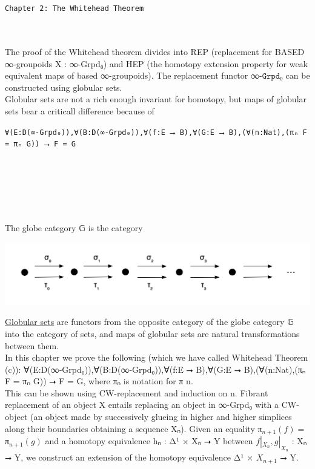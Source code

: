 \documentclass{book}
\theoremstyle{definition}
\newcounter{pcounter}
\newcounter{sectioncount}
\newcounter{subsectioncount}
\renewcommand{\section}[1]{\newpage\ \\ \ \\ \begin{center} \scalebox{1.5}{\texttt{\thesectioncount . #1}} \stepcounter{sectioncount} \setcounter{subsectioncount}{1} \end{center} \begin{center} \ \\ \ \\ \thispagestyle{empty} \end{center}}
\renewcommand{\chapter}[1]{
\newpage
{
\Huge 
\begin{center}
\ \\
\ \\
\thispagestyle{empty}
\texttt{#1}
\end{center}}
\ \\
\ \\
}
\begin{document}
\chapter{Chapter 2: The Whitehead Theorem}

The proof of the Whitehead theorem divides into REP (replacement for BASED ∞-groupoids X : ∞-Grpd₀) and HEP (the homotopy extension property for weak equivalent maps of based ∞-groupoids). The replacement functor ∞$\texttt{-Grpd}$₀ can be constructed using globular sets.\\

Globular sets are not a rich enough invariant for homotopy, but maps of globular sets bear a criticall difference because of 

\begin{center}
\texttt{∀(E:D(∞-Grpd₀)),∀(B:D(∞-Grpd₀)),∀(f:E ⭢ B),∀(G:E ⭢ B),(∀(n:Nat),(πₙ F = πₙ G)) ⭢ F = G}
\end{center}

\section{Globular Sets}

The globe category 𝔾 is the category

\begin{center}
\includegraphics[scale=0.5]{globecat.png}
\end{center}

\href{https://ncatlab.org/nlab/show/globular+set}{Globular sets} are functors from the opposite category of the globe category 𝔾 into the category of sets, and maps of globular sets are natural transformations between them.\\

In this chapter we prove the following (which we have called Whitehead Theorem (c)): ∀(E:D(∞-Grpd₀)),∀(B:D(∞-Grpd₀)),∀(f:E ⭢ B),∀(G:E ⭢ B),(∀(n:Nat),(πₙ F = πₙ G)) ⭢ F = G, where πₙ is notation for π n.\\

This can be shown using CW-replacement and induction on n. Fibrant replacement of an object X entails replacing an object in ∞-Grpd₀ with a CW-object (an object made by successively glueing in higher and higher simplices along their boundaries obtaining a sequence Xₙ). Given an equality π${}_{n+1}(f) = $π${}_{n+1}(g)$ and a homotopy equivalence hₙ : Δ¹ × Xₙ ⭢ Y between $f|_{X_n}, g|_{X_n}$ : Xₙ ⭢ Y, we construct an extension of the homotopy equivalence Δ¹ × $X_{n+1}$ ⭢ Y.\\
\end{document}
